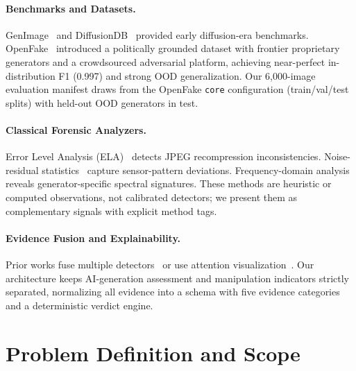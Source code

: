 \documentclass[10pt,conference,compsoc]{IEEEtran}
\begin{document}
\paragraph{Benchmarks and Datasets.}
GenImage~\cite{zhu2023genimage} and DiffusionDB~\cite{wang2022diffusiondb} provided early diffusion-era benchmarks.
OpenFake~\cite{livernoche2025openfake} introduced a politically grounded dataset with frontier proprietary generators and a crowdsourced adversarial platform, achieving near-perfect in-distribution F1 (0.997) and strong OOD generalization.
Our 6,000-image evaluation manifest draws from the OpenFake \texttt{core} configuration (train/val/test splits) with held-out OOD generators in test.

\paragraph{Classical Forensic Analyzers.}
Error Level Analysis (ELA)~\cite{krawetz2007ela} detects JPEG recompression inconsistencies.
Noise-residual statistics~\cite{li2013identification} capture sensor-pattern deviations.
Frequency-domain analysis~\cite{qian2020thinking} reveals generator-specific spectral signatures.
These methods are heuristic or computed observations, not calibrated detectors; we present them as complementary signals with explicit method tags.

\paragraph{Evidence Fusion and Explainability.}
Prior works fuse multiple detectors~\cite{cozzolino2018noiseprint, guillaro2023explaining} or use attention visualization~\cite{chefer2021transformer-interpretability}.
Our architecture keeps AI-generation assessment and manipulation indicators strictly separated, normalizing all evidence into a schema with five evidence categories and a deterministic verdict engine.

\section{Problem Definition and Scope}
\label{sec:scope}
\end{document}
